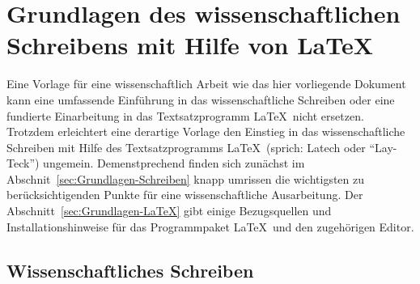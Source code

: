 \section{Grundlagen des wissenschaftlichen Schreibens mit Hilfe von \texorpdfstring{\LaTeX}{LaTeX}%
         \label{sec:Grundlagen}}

Eine Vorlage für eine wissenschaftlich Arbeit wie das hier
vorliegende Dokument kann eine umfassende Einführung in das
wissenschaftliche Schreiben oder eine fundierte Einarbeitung
in das Textsatzprogramm \LaTeX\ nicht ersetzen. 
Trotzdem erleichtert eine derartige Vorlage den Einstieg in das
wissenschaftliche Schreiben mit Hilfe des Textsatzprogramms \LaTeX\
(sprich: \glqq{}Latech\grqq{} oder "`Lay-Teck"') ungemein. 
Demenstprechend finden sich zunächst im
Abschnit~\ref{sec:Grundlagen-Schreiben} knapp umrissen die
wichtigsten zu berücksichtigenden Punkte für eine wissenschaftliche
Ausarbeitung. 
Der Abschnitt~\ref{sec:Grundlagen-LaTeX} gibt einige Bezugsquellen
und Installationshinweise für das Programmpaket \LaTeX\ und den
zugehörigen Editor. 

\subsection{Wissenschaftliches Schreiben%
            \label{sec:Grundlagen-Schreiben}}

